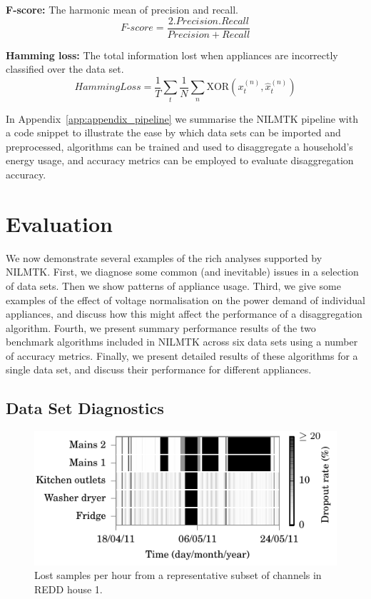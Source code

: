\documentclass{sig-alternate}
\newcommand{\appref}[1]{Appendix~\ref{#1}}
\begin{document}
\textbf{F-score:} The harmonic mean of precision and recall.
\begin{equation}
\mathit{F\text{-}score} = \frac
            {2 . \mathit{Precision} . \mathit{Recall}}
            {\mathit{Precision} + \mathit{Recall}}
\end{equation}

\textbf{Hamming loss:} The total information lost when appliances are incorrectly classified over the data set.
\begin{equation}
\mathit{HammingLoss} = 
        \frac{1}{T} \sum_{t}
        \frac{1}{N} \sum_{n}
        \mathrm{XOR} \left ( x^{(n)}_t, \hat{x}^{(n)}_t \right )
\end{equation}



\noindent
In \appref{app:appendix_pipeline} we summarise the NILMTK pipeline with a code snippet to illustrate the ease by which data sets can be imported and preprocessed, algorithms can be trained and used to disaggregate a household's energy usage, and accuracy metrics can be employed to evaluate disaggregation accuracy.


\section{Evaluation}
\label{evaluation}

\noindent
We now demonstrate several examples of the rich analyses supported by NILMTK. First, we diagnose some common (and inevitable) issues in a selection of data sets.  Then we show patterns of appliance usage. Third, we give some examples of the effect of voltage normalisation on the power demand of individual appliances, and discuss how this might affect the performance of a disaggregation algorithm. Fourth, we present summary performance results of the two benchmark algorithms included in NILMTK across six data sets using a number of accuracy metrics. Finally, we present detailed results of these algorithms for a single data set, and discuss their performance for different appliances.

\subsection{Data Set Diagnostics}

\begin{figure}[!t]
  \centering
  \includegraphics[width=\columnwidth]{figures/lost_samples.pdf} 
  \caption{Lost samples per hour from a representative subset of channels in REDD house 1.}
  \label{fig:lost_samples} 
\end{figure}
\end{document}
